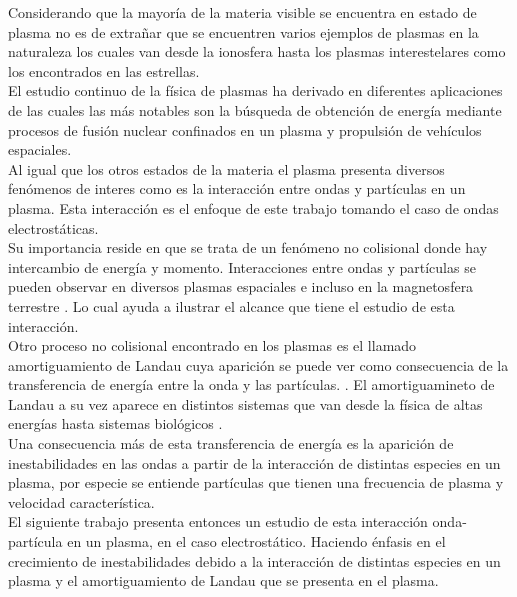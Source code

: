 \documentclass[../tesis_main_file.tex]{subfiles}
\begin{document}

Considerando que la mayoría de la materia visible se encuentra en estado de plasma \cite{bittencourt2013fundamentals} no es de extrañar que se encuentren varios ejemplos de plasmas en la naturaleza los cuales van desde la ionosfera hasta los plasmas interestelares como los encontrados en las estrellas.\\
El estudio continuo de la física de plasmas ha derivado en diferentes aplicaciones de las cuales las más notables son la búsqueda de obtención de energía mediante procesos de fusión nuclear confinados en un plasma y propulsión de vehículos espaciales.\\
Al igual que los otros estados de la materia el plasma presenta diversos fenómenos de interes como es la interacción entre ondas y partículas en un plasma. 
Esta interacción es el enfoque de este trabajo tomando el caso de ondas electrostáticas.\\
Su importancia reside en que se trata de un fenómeno no colisional donde hay intercambio de energía y momento. 
Interacciones entre ondas y partículas se pueden observar en diversos plasmas espaciales e incluso en la magnetosfera terrestre \cite{kitamura2018direct}.
Lo cual ayuda a ilustrar el alcance que tiene el estudio de esta interacción.\\
Otro proceso no colisional encontrado en los plasmas es el llamado amortiguamiento de Landau cuya aparición se puede ver como consecuencia de la transferencia de energía entre la onda y las partículas. \cite{bellan2008fundamentals}.
El amortiguamineto de Landau a su vez aparece en distintos sistemas que van desde la física de altas energías hasta sistemas biológicos \cite{sagan1994physics}.\\
Una consecuencia más de esta transferencia de energía es la aparición de inestabilidades en las ondas a partir de la interacción de distintas especies en un plasma, por especie se entiende partículas que tienen una frecuencia de plasma y velocidad característica.\\
El siguiente trabajo presenta entonces un estudio de esta interacción onda-partícula en un plasma, en el caso electrostático. Haciendo énfasis en el crecimiento de inestabilidades debido a la interacción de distintas especies en un plasma y el amortiguamiento de Landau que se presenta en el plasma.\\
\end{document}
